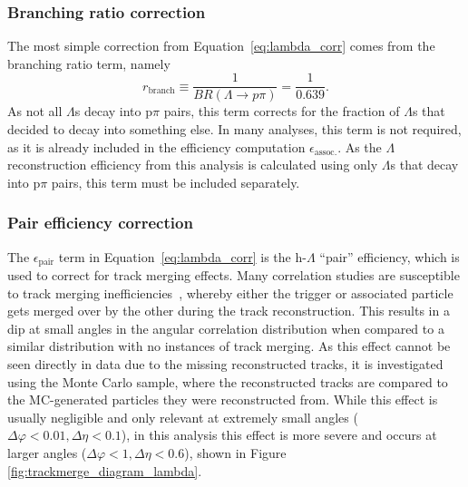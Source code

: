 \subsubsection{Branching ratio correction}

The most simple correction from Equation~\ref{eq:lambda_corr} comes from the branching ratio term, namely 
%
\begin{equation}
	r_{\text{branch}} \equiv \frac{1}{BR(\Lambda \rightarrow p\pi)} = \frac{1}{0.639}.
\end{equation}
%
As not all $\Lambda$s decay into p$\pi$ pairs, this term corrects for the fraction of $\Lambda$s that decided to decay into something else. In many analyses, this term is not required, as it is already included in the efficiency computation $\epsilon_{\text{assoc.}}$. As the $\Lambda$ reconstruction efficiency from this analysis is calculated using only $\Lambda$s that decay into p$\pi$ pairs, this term must be included separately. 

\subsubsection{Pair efficiency correction}
\label{sec:pair_eff_corr}

The $\epsilon_{\text{pair}}$ term in Equation~\ref{eq:lambda_corr} is the h-$\Lambda$ ``pair'' efficiency, which is used to correct for track merging effects. Many correlation studies are susceptible to track merging inefficiencies~\cite{TwoTrack1, TwoTrack2}, whereby either the trigger or associated particle gets merged over by the other during the track reconstruction. This results in a dip at small angles in the angular correlation distribution when compared to a similar distribution with no instances of track merging. As this effect cannot be seen directly in data due to the missing reconstructed tracks, it is investigated using the Monte Carlo sample, where the reconstructed tracks are compared to the MC-generated particles they were reconstructed from. While this effect is usually negligible and only relevant at extremely small angles ($\Delta\varphi < 0.01, \Delta\eta < 0.1$), in this analysis this effect is more severe and occurs at larger angles ($\Delta\varphi < 1, \Delta\eta < 0.6$), shown in Figure \ref{fig:trackmerge_diagram_lambda}. 

